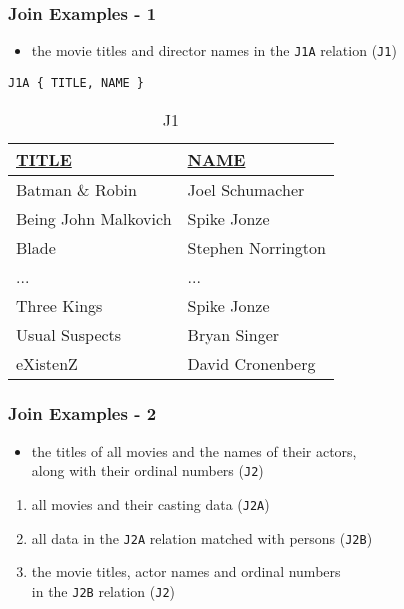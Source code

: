 \documentclass[dvipsnames]{beamer}
\theoremstyle{plain}
\begin{document}
\begin{frame}[fragile]
  \frametitle{Join Examples - 1}

  \begin{example}
    \begin{itemize}
      \item the movie titles and director names in the \texttt{J1A} relation
        (\texttt{J1})
    \end{itemize}

    \begin{lstlisting}
J1A { TITLE, NAME }
    \end{lstlisting}

    \pause
    \vspace{-10pt}
    \begin{tiny}
    \begin{table}
      \caption{J1}
      \begin{tabular}{|l|l|}\hline
\underline{TITLE}    & \underline{NAME}\\[2pt]\hline\hline
Batman \& Robin      & Joel Schumacher \\\hline
Being John Malkovich & Spike Jonze     \\\hline
Blade                & Stephen Norrington\\\hline
...                  & ...             \\\hline
Three Kings          & Spike Jonze     \\\hline
Usual Suspects       & Bryan Singer    \\\hline
eXistenZ             & David Cronenberg\\\hline
      \end{tabular}
    \end{table}
    \end{tiny}
  \end{example}
\end{frame}

\begin{frame}
  \frametitle{Join Examples - 2}

  \begin{example}
    \begin{itemize}
      \item the titles of all movies and the names of their actors,\\
        along with their ordinal numbers (\texttt{J2})
    \end{itemize}

    \pause
    \begin{enumerate}
      \item all movies and their casting data (\texttt{J2A})

      \pause
      \item all data in the \texttt{J2A} relation matched with persons
        (\texttt{J2B})

      \pause
      \item the movie titles, actor names and ordinal numbers\\
        in the \texttt{J2B} relation (\texttt{J2})
    \end{enumerate}
  \end{example}
\end{frame}
\end{document}
